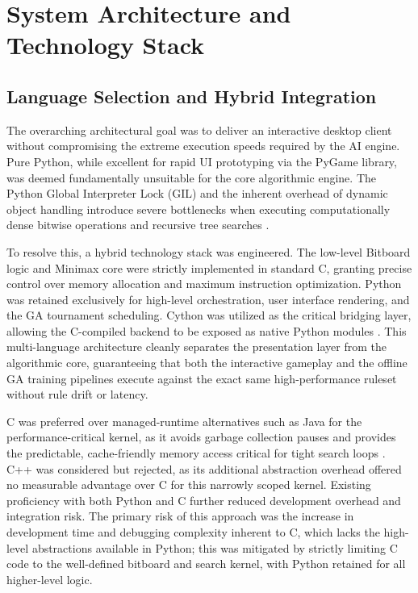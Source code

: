 \section{System Architecture and Technology Stack}
\label{sec:system_architecture}

\subsection{Language Selection and Hybrid Integration}
\label{subsec:language_selection}
The overarching architectural goal was to deliver an interactive desktop client without compromising the extreme execution speeds required by the AI engine. Pure Python, while excellent for rapid UI prototyping via the PyGame library, was deemed fundamentally unsuitable for the core algorithmic engine. The Python Global Interpreter Lock (GIL) and the inherent overhead of dynamic object handling introduce severe bottlenecks when executing computationally dense bitwise operations and recursive tree searches \cite{beazley2010}.

To resolve this, a hybrid technology stack was engineered. The low-level Bitboard logic and Minimax core were strictly implemented in standard C, granting precise control over memory allocation and maximum instruction optimization. Python was retained exclusively for high-level orchestration, user interface rendering, and the GA tournament scheduling. Cython was utilized as the critical bridging layer, allowing the C-compiled backend to be exposed as native Python modules \cite{behnel2011cython}. This multi-language architecture cleanly separates the presentation layer from the algorithmic core, guaranteeing that both the interactive gameplay and the offline GA training pipelines execute against the exact same high-performance ruleset without rule drift or latency.

C was preferred over managed-runtime alternatives such as Java for the performance-critical kernel, as it avoids garbage collection pauses and provides the predictable, cache-friendly memory access critical for tight search loops \cite{wingqvist2022dod, arantes2025impact}. C++ was considered but rejected, as its additional abstraction overhead offered no measurable advantage over C for this narrowly scoped kernel. Existing proficiency with both Python and C further reduced development overhead and integration risk. The primary risk of this approach was the increase in development time and debugging complexity inherent to C, which lacks the high-level abstractions available in Python; this was mitigated by strictly limiting C code to the well-defined bitboard and search kernel, with Python retained for all higher-level logic.

